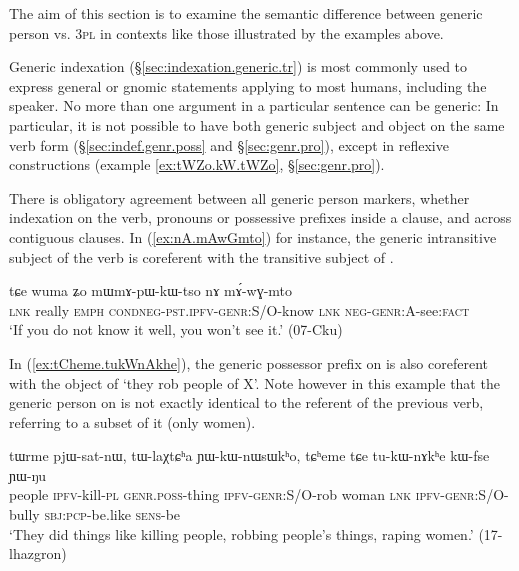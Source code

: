 The aim of this section is to examine the semantic difference between generic person vs. \textsc{3pl} in contexts like those illustrated by the examples above.

Generic indexation (§\ref{sec:indexation.generic.tr}) is most commonly used to express general or gnomic statements applying to most humans, including the speaker. No more than one argument in a particular sentence can be generic: In particular, it is not possible to have both generic subject and object on the same verb form (§\ref{sec:indef.genr.poss} and §\ref{sec:genr.pro}), except in reflexive constructions (example \ref{ex:tWZo.kW.tWZo}, §\ref{sec:genr.pro}). 

There is obligatory agreement between all generic person markers, whether indexation on the verb, pronouns or possessive prefixes inside a clause, and across contiguous clauses. In (\ref{ex:nA.mAwGmto}) for instance, the generic intransitive subject of the verb  is coreferent with the transitive subject of .

\begin{exe}
\ex   \label{ex:nA.mAwGmto}
 \gll   tɕe wuma ʑo mɯ\redp{}mɤ-pɯ-kɯ-tso nɤ mɤ́-wɣ-mto \\
 \textsc{lnk} really \textsc{emph} \textsc{cond}\redp{}\textsc{neg}-\textsc{pst}.\textsc{ipfv}-\textsc{genr}:S/O-know \textsc{lnk} \textsc{neg}-\textsc{genr}:\textsc{A}-see:\textsc{fact} \\
\glt `If you do not know it well, you won't see it.'   (07-Cku) 
\end{exe}

In (\ref{ex:tCheme.tukWnAkhe}), the generic possessor prefix on  is also coreferent with the object of  `they rob people of X'. Note however in this example that the generic person on  is not exactly identical to the referent of the previous verb, referring to a subset of it (only women).

\begin{exe}
\ex   \label{ex:tCheme.tukWnAkhe}
 \gll  tɯrme pjɯ-sat-nɯ, tɯ-laχtɕʰa ɲɯ-kɯ-nɯsɯkʰo, tɕʰeme tɕe tu-kɯ-nɤkʰe kɯ-fse ɲɯ-ŋu \\
 people \textsc{ipfv}-kill-\textsc{pl} \textsc{genr}.\textsc{poss}-thing \textsc{ipfv}-\textsc{genr}:S/O-rob woman \textsc{lnk} \textsc{ipfv}-\textsc{genr}:S/O-bully \textsc{sbj}:\textsc{pcp}-be.like \textsc{sens}-be \\
 \glt `They did things like killing people, robbing people's things, raping women.' (17-lhazgron)
\end{exe}

